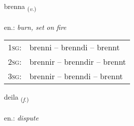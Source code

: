 \documentclass[frontgrid, backgrid]{flacards}\usepackage[]{graphicx}\usepackage[]{xcolor}
\begin{document}
\renewcommand{\flhead}{\vskip5pt \fboxsep=0pt {\small\bfseries\footnotesize Sagnorð | Verb}}
\renewcommand{\fcfoot}{\vskip5pt \fboxsep=0pt \hspace{2pt}{\small\bfseries\footnotesize 2K}}

\renewcommand{\blhead}{\vskip5pt {\small\bfseries\footnotesize Sagnorð | Verb }}
\renewcommand{\bcfoot}{\vskip5pt \hspace{2pt}{\small\bfseries\footnotesize 2K}}


{brenna \small{\textsubscript{(\textit{v.})}} \\[1ex] %
\textphonetic{[prɛna]} \\
en.: \emph{burn, set on fire} \\  [2ex]
\renewcommand*{\arraystretch}{0.8}
\begin{tabular}{p{1cm}l}
\textsc{1sg}: & brenni -- brenndi -- brennt \\ 
\textsc{2sg}: & brennir -- brenndir -- brennt \\ 
\textsc{3sg}: & brennir -- brenndi -- brennt \\ 
\end{tabular}
}

\renewcommand{\flhead}{\vskip5pt \fboxsep=0pt {\small\bfseries\footnotesize Nafnorð | Noun}}
\renewcommand{\fcfoot}{\vskip5pt \fboxsep=0pt \hspace{2pt}{\small\bfseries\footnotesize 2K}}

\renewcommand{\blhead}{\vskip5pt {\small\bfseries\footnotesize Nafnorð | Noun }}
\renewcommand{\bcfoot}{\vskip5pt \hspace{2pt}{\small\bfseries\footnotesize 2K}}


{deila \small{\textsubscript{(\textit{f.})}} \\[1ex] %
\textphonetic{[teiːla]} \\
en.: \emph{dispute} \\  [2ex]
\renewcommand*{\arraystretch}{0.8}
}
\end{document}
